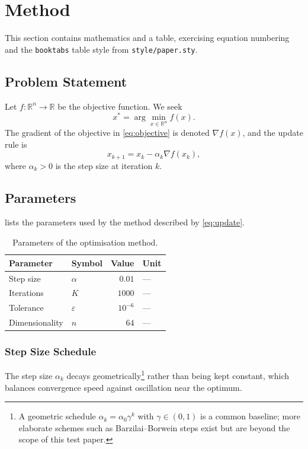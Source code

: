 \section{Method}
\label{sec:method}

This section contains mathematics and a table, exercising equation numbering
and the \texttt{booktabs} table style from \texttt{style/paper.sty}.

\subsection{Problem Statement}

Let $f \colon \mathbb{R}^n \to \mathbb{R}$ be the objective function. We seek
\begin{equation}
  \label{eq:objective}
  x^\ast = \arg\min_{x \in \mathbb{R}^n} f(x).
\end{equation}
The gradient of the objective in \cref{eq:objective} is denoted
$\nabla f(x)$, and the update rule is
\begin{equation}
  \label{eq:update}
  x_{k+1} = x_k - \alpha_k \nabla f(x_k),
\end{equation}
where $\alpha_k > 0$ is the step size at iteration $k$.

\subsection{Parameters}

 lists the parameters used by the method described by
\cref{eq:update}.

\begin{table}[htbp]
  \centering
  \caption{Parameters of the optimisation method.}
  \label{tab:parameters}
  \begin{tabular}{llrl}
    \toprule
    \textbf{Parameter} & \textbf{Symbol} & \textbf{Value} & \textbf{Unit} \\
    \midrule
    Step size        & $\alpha$   & $0.01$ & --- \\
    Iterations       & $K$        & $1000$ & --- \\
    Tolerance        & $\varepsilon$ & $10^{-6}$ & --- \\
    Dimensionality   & $n$        & $64$   & --- \\
    \bottomrule
  \end{tabular}
\end{table}

\subsubsection{Step Size Schedule}
\label{sec:step-size}

The step size $\alpha_k$ decays geometrically\footnote{A geometric
schedule $\alpha_k = \alpha_0 \gamma^k$ with $\gamma \in (0, 1)$ is a
common baseline; more elaborate schemes such as Barzilai--Borwein
steps exist but are beyond the scope of this test paper.} rather than
being kept constant, which balances convergence speed against
oscillation near the optimum.

